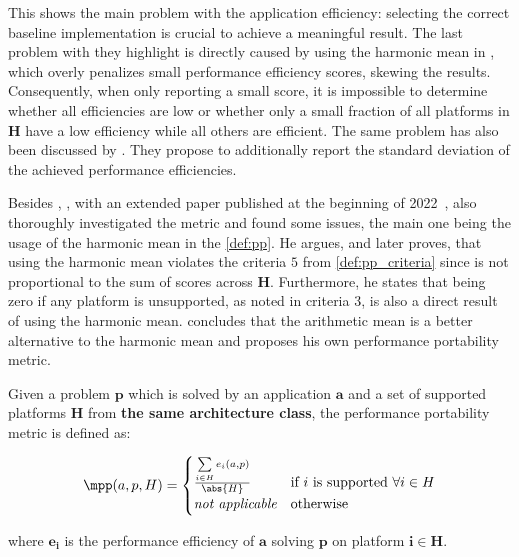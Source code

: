 This shows the main problem with the application efficiency: selecting the correct baseline implementation is crucial to achieve a meaningful result. 
The last problem with \pp they highlight is directly caused by using the harmonic mean in \pp, which overly penalizes small performance efficiency scores, skewing the results. 
Consequently, when only reporting a small \pp score, it is impossible to determine whether all efficiencies are low or whether only a small fraction of all platforms in $\mathbf{H}$ have a low efficiency while all others are efficient. 
The same problem has also been discussed by \citet{bertoni_performance_2020}. 
They propose to additionally report the standard deviation of the achieved performance efficiencies. 

Besides \citeauthor{yokota_beginners_2018}, \citet{marowka_toward_2021}, with an extended paper published at the beginning of 2022~\cite{marowka_reformulation_2022}, also thoroughly investigated the \pp metric and found some issues, the main one being the usage of the harmonic mean in the \pp \autoref{def:pp}. 
He argues, and later proves, that using the harmonic mean violates the criteria $5$ from \autoref{def:pp_criteria} since \pp is not proportional to the sum of scores across $\mathbf{H}$. 
Furthermore, he states that \pp being zero if any platform is unsupported, as noted in criteria $3$, is also a direct result of using the harmonic mean. 
\citeauthor{marowka_toward_2021} concludes that the arithmetic mean is a better alternative to the harmonic mean and proposes his own performance portability metric. 

\begin{definition}\label{def:mpp_provisional}
    Given a problem $\mathbf{p}$ which is solved by an application $\mathbf{a}$ and a set of supported platforms $\mathbf{H}$ from \textbf{the same architecture class}, the performance portability metric \mpp is defined as:

    \[ \mpp(a, p, H) = 
        \begin{cases}
            \frac{\sum\limits_{i \in H} e_i(a, p)}{\abs{H}} & \text{if }i\text{ is supported }\forall i \in H \\
            \textit{not applicable}                         & \text{otherwise}
        \end{cases} 
    \]

    where $\mathbf{e_i}$ is the performance efficiency of $\mathbf{a}$ solving $\mathbf{p}$ on platform $\mathbf{i \in H}$.
\end{definition}

